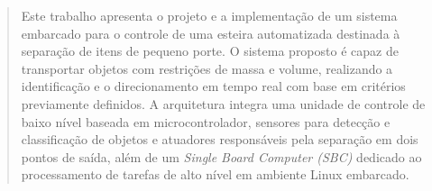 
\begin{abstract}

Este trabalho apresenta o projeto e a implementação de um sistema embarcado para o controle de uma esteira automatizada destinada à separação de itens de pequeno porte. O sistema proposto é capaz de transportar objetos com restrições de massa e volume, realizando a identificação e o direcionamento em tempo real com base em critérios previamente definidos. A arquitetura integra uma unidade de controle de baixo nível baseada em microcontrolador, sensores para detecção e classificação de objetos e atuadores responsáveis pela separação em dois pontos de saída, além de um \textit{Single Board Computer (SBC)} dedicado ao processamento de tarefas de alto nível em ambiente Linux embarcado.
 
\end{abstract}

